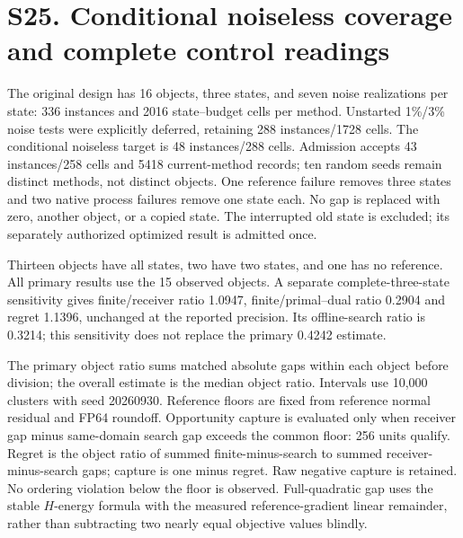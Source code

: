 \section*{S25. Conditional noiseless coverage and complete control readings}
The original design has 16 objects, three states, and seven noise realizations per state: 336 instances and 2016 state--budget cells per method. Unstarted 1\%/3\% noise tests were explicitly deferred, retaining 288 instances/1728 cells. The conditional noiseless target is 48 instances/288 cells. Admission accepts 43 instances/258 cells and 5418 current-method records; ten random seeds remain distinct methods, not distinct objects. One reference failure removes three states and two native process failures remove one state each. No gap is replaced with zero, another object, or a copied state. The interrupted old state is excluded; its separately authorized optimized result is admitted once.

Thirteen objects have all states, two have two states, and one has no reference. All primary results use the 15 observed objects. A separate complete-three-state sensitivity gives finite/receiver ratio 1.0947, finite/primal--dual ratio 0.2904 and regret 1.1396, unchanged at the reported precision. Its offline-search ratio is 0.3214; this sensitivity does not replace the primary 0.4242 estimate.

The primary object ratio sums matched absolute gaps within each object before division; the overall estimate is the median object ratio. Intervals use 10,000 clusters with seed 20260930. Reference floors are fixed from reference normal residual and FP64 roundoff. Opportunity capture is evaluated only when receiver gap minus same-domain search gap exceeds the common floor: 256 units qualify. Regret is the object ratio of summed finite-minus-search to summed receiver-minus-search gaps; capture is one minus regret. Raw negative capture is retained. No ordering violation below the floor is observed. Full-quadratic gap uses the stable $H$-energy formula with the measured reference-gradient linear remainder, rather than subtracting two nearly equal objective values blindly.

